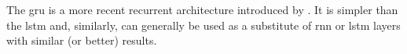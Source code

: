 

The \gls{gru} is a more recent recurrent architecture
introduced by \textcite{cho2014learning}. It is simpler than
the \gls{lstm} and, similarly, can generally be used as a
substitute of \gls{rnn} or \gls{lstm} layers with similar
(or better) results.
